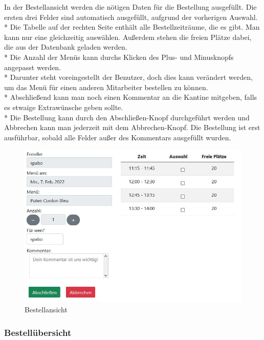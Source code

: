 In der Bestellansicht werden die nötigen Daten für die Bestellung ausgefüllt. Die ersten drei Felder sind automatisch ausgefüllt, aufgrund der vorherigen Auswahl. \\*
Die Tabelle auf der rechten Seite enthält alle Bestellzeiträume, die es gibt. Man kann nur eine gleichzeitig auswählen. Außerdem stehen die freien Plätze dabei, die aus der Datenbank geladen werden.\\*
Die Anzahl der Menüs kann durchs Klicken des Plus- und Minusknopfs angepasst werden.  \\*
Darunter steht voreingestellt der Benutzer, doch dies kann verändert werden, um das Menü für einen anderen Mitarbeiter bestellen zu können. \\*
Abschließend kann man noch einen Kommentar an die Kantine mitgeben, falls es etwaige Extrawünsche geben sollte. \\*
Die Bestellung kann durch den Abschließen-Knopf durchgeführt werden und Abbrechen kann man jederzeit mit dem Abbrechen-Knopf.
Die Bestellung ist erst ausführbar, sobald alle Felder außer des Kommentars ausgefüllt wurden.
\begin{figure}[htp]
    \centering
    \includegraphics[scale=0.7]{pics/mitarbeiter-bestellen.JPG}
    \caption{Bestellansicht}
    \label{fig:impl:BestellenMitarbeiter}
\end{figure}
\pagebreak

\subsubsection {Bestellübersicht}

